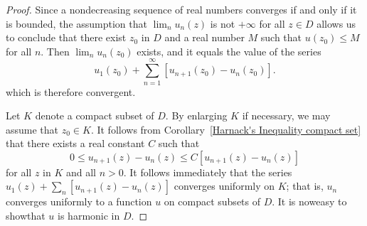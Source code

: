 \begin{proof}
Since a nondecreasing sequence of real numbers converges if and only if it is bounded, the assumption that $\lim_nu_n(z)$ is not $+\infty$ for all $z\in D$ allows us to conclude that there exist $z_0$ in $D$ and a real number $M$ such that $u(z_0)\leq M$ for all $n$. Then $\lim_nu_n(z_0)$ exists, and it equals the value of the series
\[u_1(z_0)+\sum_{n=1}^{\infty}[u_{n+1}(z_0)-u_n(z_0)].\]
which is therefore convergent.\par
Let $K$ denote a compact subset of $D$. By enlarging $K$ if necessary, we may assume that $z_0\in K$. It follows from Corollary~\ref{Harnack's Inequality compact set} that there exists a real constant $C$ such that
\[0\leq u_{n+1}(z)-u_n(z)\leq C[u_{n+1}(z)-u_n(z)]\]
for all $z$ in $K$ and all $n>0$. It follows immediately that the series $u_1(z)+\sum_{n}[u_{n+1}(z)-u_n(z)]$ converges uniformly on $K$; that is, $u_n$ converges uniformly to a function $u$ on compact subsets of $D$. It is noweasy to showthat $u$ is harmonic in $D$.
\end{proof}
